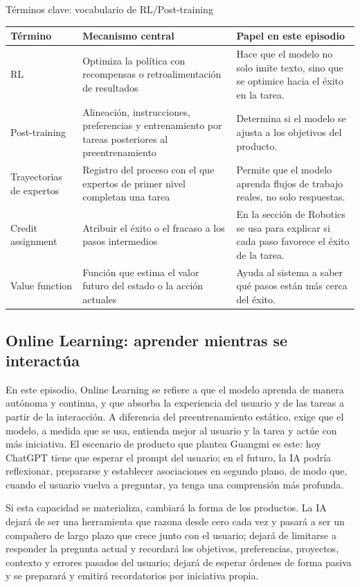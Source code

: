 \begin{knowledgebox}{Términos clave: vocabulario de RL/Post-training}
\begin{tabularx}{\textwidth}{p{}p{}X}
\toprule
Término & Mecanismo central & Papel en este episodio \\
\midrule
RL & Optimiza la política con recompensas o retroalimentación de resultados & Hace que el modelo no solo imite texto, sino que se optimice hacia el éxito en la tarea. \\
Post-training & Alineación, instrucciones, preferencias y entrenamiento por tareas posteriores al preentrenamiento & Determina si el modelo se ajusta a los objetivos del producto. \\
Trayectorias de expertos & Registro del proceso con el que expertos de primer nivel completan una tarea & Permite que el modelo aprenda flujos de trabajo reales, no solo respuestas. \\
Credit assignment & Atribuir el éxito o el fracaso a los pasos intermedios & En la sección de Robotics se usa para explicar si cada paso favorece el éxito de la tarea. \\
Value function & Función que estima el valor futuro del estado o la acción actuales & Ayuda al sistema a saber qué pasos están más cerca del éxito. \\
\bottomrule
\end{tabularx}
\end{knowledgebox}

\subsection{Online Learning: aprender mientras se interactúa}

En este episodio, Online Learning se refiere a que el modelo aprenda de manera autónoma y continua, y que absorba la experiencia del usuario y de las tareas a partir de la interacción. A diferencia del preentrenamiento estático, exige que el modelo, a medida que se usa, entienda mejor al usuario y la tarea y actúe con más iniciativa. El escenario de producto que plantea Guangmi es este: hoy ChatGPT tiene que esperar el prompt del usuario; en el futuro, la IA podría reflexionar, prepararse y establecer asociaciones en segundo plano, de modo que, cuando el usuario vuelva a preguntar, ya tenga una comprensión más profunda.

Si esta capacidad se materializa, cambiará la forma de los productos. La IA dejará de ser una herramienta que razona desde cero cada vez y pasará a ser un compañero de largo plazo que crece junto con el usuario; dejará de limitarse a responder la pregunta actual y recordará los objetivos, preferencias, proyectos, contexto y errores pasados del usuario; dejará de esperar órdenes de forma pasiva y se preparará y emitirá recordatorios por iniciativa propia.

